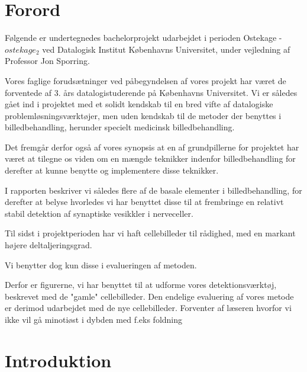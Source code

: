 \thispagestyle{plain}
\section{Forord}
Følgende er undertegnedes bachelorprojekt udarbejdet i perioden Ostekage - $ostekage_2$ ved Datalogisk Institut Københavns Universitet, under vejledning af Professor Jon Sporring.

Vores faglige forudsætninger ved påbegyndelsen af vores projekt har været de forventede af 3. års datalogistuderende på Københavns Universitet. Vi er således gået ind i projektet med et solidt kendskab til en bred vifte af datalogiske problemløsningsværktøjer, men uden kendskab til de metoder der benyttes i billedbehandling, herunder specielt medicinsk billedbehandling.

Det fremgår derfor også af vores synopsis at en af grundpillerne for projektet har været at tilegne os viden om en mængde teknikker indenfor billedbehandling for derefter at kunne benytte og implementere disse teknikker. 

I rapporten beskriver vi således flere af de basale elementer i billedbehandling, for derefter at belyse hvorledes vi har benyttet disse til at frembringe en relativt stabil detektion af synaptiske vesikkler i nerveceller.


Til sidst i projektperioden har vi haft cellebilleder til rådighed, med en markant højere deltaljeringsgrad.

Vi benytter dog kun disse i evalueringen af metoden. 

Derfor er figurerne, vi har benyttet til at udforme vores detektionsværktøj, beskrevet med de "gamle" cellebilleder. Den endelige evaluering af vores metode er derimod udarbejdet med de nye cellebilleder.
%
Forventer af læseren hvorfor vi ikke vil gå minotiøst i dybden med f.eks foldning

\section{Introduktion}

